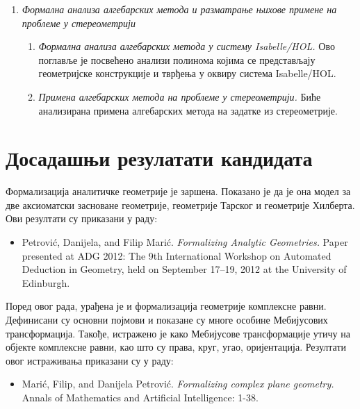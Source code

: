 \documentclass[11pt]{article}
\newcommand{\lat}{}
\begin{document}
\begin{enumerate}
\item \emph{Формална анализа алгебарских метода и разматрање њихове примене на проблеме у сте\-ре\-о\-мет\-ри\-ји}
      \begin{enumerate}[label*=\arabic*.]
      \item {\em Формална анализа алгебарских метода у систему {\lat
            Isabelle/HOL}.} Ово поглавље је посвећено анализи полинома
        којима се представљају геометријске конструкције и тврђења у
        оквиру система {\lat Isabelle/HOL}.
      \item {\em Примена алгебарских метода на проблеме у
          стереометрији.} Биће анализирана примена алгебарских метода
        на задатке из стереометрије.
      \end{enumerate}
\end{enumerate}


\section{Досадашњи резулатати кандидата}

Формализација аналитичке геометрије је заршена. Показано је да је она модел
за две аксиоматски засноване геометрије, геометрије Тарског и геометрије 
Хилберта. Ови резултати су приказани у раду:
\begin{itemize}
\item Petrović, Danijela, and Filip Marić. {\em Formalizing Analytic
    Geometries.} Paper presented at ADG 2012: The 9th
      International Workshop on Automated Deduction in Geometry, held
      on September 17--19, 2012 at the University of Edinburgh.
\end{itemize}

Поред овог рада, урађена је и формализација геометрије комплексне
равни. Дефинисани су основни појмови и показане су многе особине
Мебијусових трансформација. Такође, истражено је како Мебијусове
трансформације утичу на објекте комплексне равни, као што су права,
круг, угао, оријентација. Резултати овог истраживања приказани су у
раду:
\begin{itemize}
\item Marić, Filip, and Danijela Petrović. {\em Formalizing complex
    plane geometry.} Annals of Mathematics and Artificial
      Intelligence: 1-38.
\end{itemize}
\end{document}

